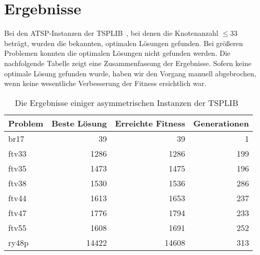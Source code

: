 \chapter{Ergebnisse}
Bei den ATSP-Instanzen der TSPLIB~\cite{tsplib}, bei denen die Knotenanzahl $\leq 33$ 
beträgt, wurden die bekannten, optimalen Lösungen gefunden. Bei größeren
Problemen konnten die optimalen Lösungen nicht gefunden werden. Die
nachfolgende Tabelle zeigt eine Zusammenfassung der Ergebnisse. Sofern
keine optimale Lösung gefunden wurde, haben wir den Vorgang manuell
abgebrochen, wenn keine wesentliche Verbesserung der Fitness ersichtlich
war.
\begin{table}[H]
  \centering
{
  \setmainfont[Numbers={Uppercase,Monospaced}]{Vollkorn}
  \begin{tabular}{lrrr}
    Problem & Beste Lösung & Erreichte Fitness & Generationen \\
    \hline
    br17    & 39           & 39                & 1            \\
    ftv33   & 1286         & 1286              & 199          \\
    ftv35   & 1473         & 1475              & 196          \\
    ftv38   & 1530         & 1536              & 286          \\
    ftv44   & 1613         & 1653              & 237          \\
    ftv47   & 1776         & 1794              & 233          \\
    ftv55   & 1608         & 1691              & 252          \\
    ry48p   & 14422        & 14608             & 313          \\
  \end{tabular}
}
  \caption[Ergebnisse TSPLIB Instanzen]{Die Ergebnisse einiger asymmetrischen Instanzen der
  TSPLIB~\cite{tsplib}}
\end{table}
